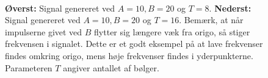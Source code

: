 \documentclass[a4paper, 10pt, danish, final]{article}
\begin{document}
\begin{figure}[!h]
    \centering
    \\
    \caption[]{
    \textbf{Øverst:} Signal genereret ved $A = 10, B = 20$ og $T = 8$.
    \textbf{Nederst:} Signal genereret ved $A = 10, B = 20$ og $T = 16$.
    Bemærk, at når impulserne givet ved $B$ flytter sig længere væk fra
    origo, så stiger frekvensen i signalet. Dette er et godt eksempel på
    at lave frekvenser findes omkring origo, mens høje frekvenser findes
    i yderpunkterne. Parameteren $T$ angiver antallet af bølger.
    }
    \label{signal_10_20_8_16}
\end{figure}
\end{document}
